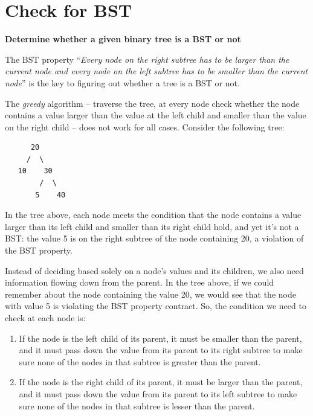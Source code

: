 \documentclass[a4paper,11pt]{book}
\begin{document}
\newpage
\section{Check for BST}
\noindent \textbf{Determine whether a given binary tree is a BST or not}
\vspace{5mm}

\noindent  The BST property ``\textit{Every node on the right subtree has to be larger than the current node and every node on the left subtree has to be smaller than the current node}'' is the key to figuring out whether a tree is a BST or not.

\vspace{3mm}

\noindent The \textit{greedy} algorithm – traverse the tree, at every node check whether the node contains a value larger than the value at the left child and smaller than the value on the right child – does not work for all cases. Consider the following tree:

\begin{lstlisting}
      20
     /  \
   10    30
        /  \
       5    40
\end{lstlisting}

\noindent In the tree above, each node meets the condition that the node contains a value larger than its left child and smaller than its right child hold, and yet it’s not a BST: the value 5 is on the right subtree of the node containing 20, a violation of the BST property.
\vspace{3mm}

\noindent Instead of deciding based solely on a node’s values and its children, we also need information flowing down from the parent. In the tree above, if we could remember about the node containing the value 20, we would see that the node with value 5 is violating the BST property contract. So, the condition we need to check at each node is:
\begin{enumerate}
    \item If the node is the left child of its parent, it must be smaller than the parent, and it must pass down the value from its parent to its right subtree to make sure none of the nodes in that subtree is greater than the parent.
    \item If the node is the right child of its parent, it must be larger than the parent, and it must pass down the value from its parent to its left subtree to make sure none of the nodes in that subtree is lesser than the parent.
\end{enumerate}
\end{document}
